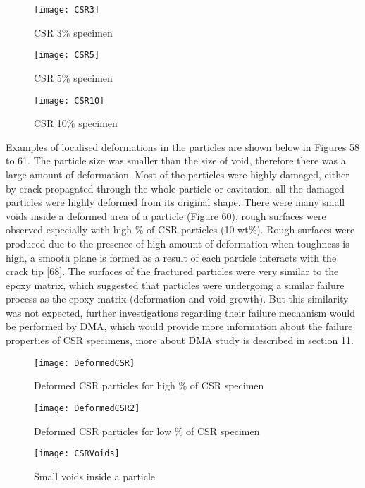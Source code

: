 \documentclass[numbers=noendperiod,chapterprefix=on]{icldt} %
\begin{document}
\begin{figure}[!htpb]
\centering
\texttt{[image: CSR3]}
\caption{CSR 3\% specimen}
\end{figure}

\begin{figure}[!htpb]
\centering
\texttt{[image: CSR5]}
\caption{CSR 5\% specimen}
\end{figure}

\begin{figure}[!htpb]
\centering
\texttt{[image: CSR10]}
\caption{CSR 10\% specimen}
\end{figure}

Examples of localised deformations in the particles are shown below in Figures 58 to 61. The particle size was smaller than the size of void, therefore there was a large amount of deformation. Most of the particles were highly damaged, either by crack propagated through the whole particle or cavitation, all the damaged particles were highly deformed from its original shape. There were many small voids inside a deformed area of a particle (Figure 60), rough surfaces were observed especially with high \% of CSR particles (10 wt\%). Rough surfaces were produced due to the presence of high amount of deformation when toughness is high, a smooth plane is formed as a result of each particle interacts with the crack tip [68]. The surfaces of the fractured particles were very similar to the epoxy matrix, which suggested that particles were undergoing a similar failure process as the epoxy matrix (deformation and void growth). But this similarity was not expected, further investigations regarding their failure mechanism would be performed by DMA, which would provide more information about the failure properties of CSR specimens, more about DMA study is described in section 11.

\begin{figure}[!htpb]
\centering
\texttt{[image: DeformedCSR]}
\caption{Deformed CSR particles for high \% of CSR specimen }
\end{figure}

\begin{figure}[!htpb]
\centering
\texttt{[image: DeformedCSR2]}
\caption{Deformed CSR particles for low \% of CSR specimen }
\end{figure}

\begin{figure}[!htpb]
\centering
\texttt{[image: CSRVoids]}
\caption{Small voids inside a particle}
\end{figure}
\end{document}
